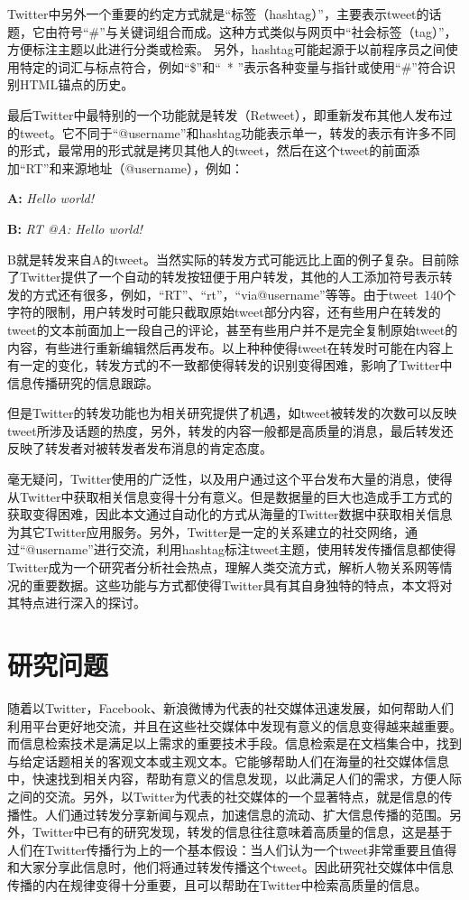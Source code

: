 Twitter中另外一个重要的约定方式就是“标签（hashtag）”，主要表示tweet的话题，它由符号“\#”与关键词组合而成。这种方式类似与网页中“社会标签（tag）”，方便标注主题以此进行分类或检索。 另外，hashtag可能起源于以前程序员之间使用特定的词汇与标点符合，例如“\$”和“\ * ”表示各种变量与指针或使用“\#”符合识别HTML锚点的历史。

最后Twitter中最特别的一个功能就是转发（Retweet），即重新发布其他人发布过的tweet。它不同于“@username”和hashtag功能表示单一，转发的表示有许多不同的形式，最常用的形式就是拷贝其他人的tweet，然后在这个tweet的前面添加“RT”和来源地址（@username），例如：
 \begin{description}
    \item \textbf{A:} \emph{Hello world!}
    \item \textbf{B:} \emph{RT @A: Hello world!}
  \end{description}  
B就是转发来自A的tweet。当然实际的转发方式可能远比上面的例子复杂。目前除了Twitter提供了一个自动的转发按钮便于用户转发，其他的人工添加符号表示转发的方式还有很多，例如，“RT”、“rt”，“via@username”等等。由于tweet~140个字符的限制，用户转发时可能只截取原始tweet部分内容，还有些用户在转发的tweet的文本前面加上一段自己的评论，甚至有些用户并不是完全复制原始tweet的内容，有些进行重新编辑然后再发布。以上种种使得tweet在转发时可能在内容上有一定的变化，转发方式的不一致都使得转发的识别变得困难，影响了Twitter中信息传播研究的信息跟踪。

但是Twitter的转发功能也为相关研究提供了机遇，如tweet被转发的次数可以反映tweet所涉及话题的热度，另外，转发的内容一般都是高质量的消息，最后转发还反映了转发者对被转发者发布消息的肯定态度。

毫无疑问，Twitter使用的广泛性，以及用户通过这个平台发布大量的消息，使得从Twitter中获取相关信息变得十分有意义。但是数据量的巨大也造成手工方式的获取变得困难，因此本文通过自动化的方式从海量的Twitter数据中获取相关信息为其它Twitter应用服务。另外，Twitter是一定的关系建立的社交网络，通过“@username”进行交流，利用hashtag标注tweet主题，使用转发传播信息都使得Twitter成为一个研究者分析社会热点，理解人类交流方式，解析人物关系网等情况的重要数据。这些功能与方式都使得Twitter具有其自身独特的特点，本文将对其特点进行深入的探讨。

\section{研究问题}
\label{point}
随着以Twitter，Facebook、新浪微博为代表的社交媒体迅速发展，如何帮助人们利用平台更好地交流，并且在这些社交媒体中发现有意义的信息变得越来越重要。而信息检索技术是满足以上需求的重要技术手段。信息检索是在文档集合中，找到与给定话题相关的客观文本或主观文本。它能够帮助人们在海量的社交媒体信息中，快速找到相关内容，帮助有意义的信息发现，以此满足人们的需求，方便人际之间的交流。另外，以Twitter为代表的社交媒体的一个显著特点，就是信息的传播性。人们通过转发分享新闻与观点，加速信息的流动、扩大信息传播的范围。另外，Twitter中已有的研究发现，转发的信息往往意味着高质量的信息，这是基于人们在Twitter传播行为上的一个基本假设：当人们认为一个tweet非常重要且值得和大家分享此信息时，他们将通过转发传播这个tweet。因此研究社交媒体中信息传播的内在规律变得十分重要，且可以帮助在Twitter中检索高质量的信息。

